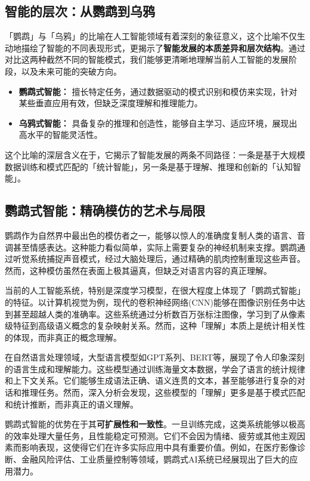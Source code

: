 \subsection{智能的层次：从鹦鹉到乌鸦}

「鹦鹉」与「乌鸦」的比喻在人工智能领域有着深刻的象征意义，这个比喻不仅生动地描绘了智能的不同表现形式，更揭示了{\bf 智能发展的本质差异和层次结构}。通过对比这两种截然不同的智能模式，我们能够更清晰地理解当前人工智能的发展阶段，以及未来可能的突破方向。

\begin{itemize}
\item {\bf 鹦鹉式智能：} 擅长特定任务，通过数据驱动的模式识别和模仿来实现，针对某些垂直应用有效，但缺乏深度理解和推理能力。
\item {\bf 乌鸦式智能：} 具备复杂的推理和创造性，能够自主学习、适应环境，展现出高水平的智能灵活性。
\end{itemize}

这个比喻的深层含义在于，它揭示了智能发展的两条不同路径：一条是基于大规模数据训练和模式匹配的「统计智能」，另一条是基于理解、推理和创新的「认知智能」。

\subsection{鹦鹉式智能：精确模仿的艺术与局限}

鹦鹉作为自然界中最出色的模仿者之一，能够以惊人的准确度复制人类的语言、音调甚至情感表达。这种能力看似简单，实际上需要复杂的神经机制来支撑。鹦鹉通过听觉系统捕捉声音模式，经过大脑处理后，通过精确的肌肉控制重现这些声音。然而，这种模仿虽然在表面上极其逼真，但缺乏对语言内容的真正理解。

当前的人工智能系统，特别是深度学习模型，在很大程度上体现了「鹦鹉式智能」的特征。以计算机视觉为例，现代的卷积神经网络(CNN)能够在图像识别任务中达到甚至超越人类的准确率。这些系统通过分析数百万张标注图像，学习到了从像素级特征到高级语义概念的复杂映射关系。然而，这种「理解」本质上是统计相关性的体现，而非真正的概念理解。

在自然语言处理领域，大型语言模型如GPT系列、BERT等，展现了令人印象深刻的语言生成和理解能力。这些模型通过训练海量文本数据，学会了语言的统计规律和上下文关系。它们能够生成语法正确、语义连贯的文本，甚至能够进行复杂的对话和推理任务。然而，深入分析会发现，这些模型的「理解」更多是基于模式匹配和统计推断，而非真正的语义理解。

鹦鹉式智能的优势在于其{\bf 可扩展性和一致性}。一旦训练完成，这类系统能够以极高的效率处理大量任务，且性能稳定可预测。它们不会因为情绪、疲劳或其他主观因素而影响表现，这使得它们在许多实际应用中具有重要价值。例如，在医疗影像诊断、金融风险评估、工业质量控制等领域，鹦鹉式AI系统已经展现出了巨大的应用潜力。

